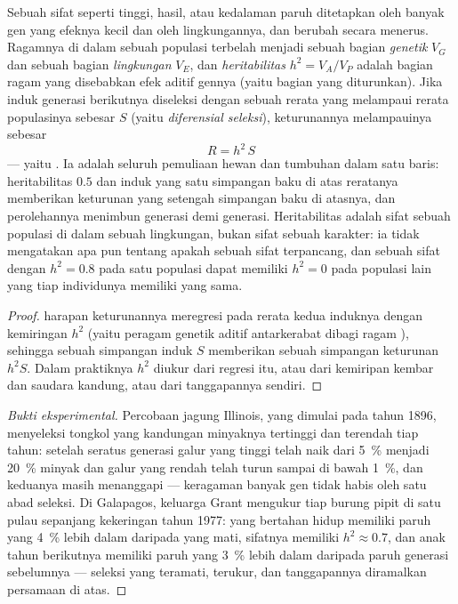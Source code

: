 \begin{theorem}\label{thm:b2:population-genetics:heritability}
Sebuah sifat seperti tinggi, hasil, atau kedalaman paruh ditetapkan
oleh banyak gen yang efeknya kecil dan oleh lingkungannya, dan berubah
secara menerus. Ragamnya di dalam sebuah populasi terbelah menjadi
sebuah bagian \emph{genetik} $V_G$ dan sebuah bagian \emph{lingkungan}
$V_E$, dan \emph{heritabilitas} $h^{2} = V_A/V_P$ adalah bagian ragam
 yang disebabkan efek aditif gennya (yaitu bagian yang
diturunkan). Jika induk generasi berikutnya diseleksi dengan sebuah
rerata yang melampaui rerata populasinya sebesar $S$ (yaitu
\emph{diferensial seleksi}), keturunannya melampauinya sebesar
\[
R = h^{2}\,S
\]
--- yaitu \emph{}. Ia adalah seluruh pemuliaan hewan
dan tumbuhan dalam satu baris: heritabilitas $0.5$ dan induk yang satu
simpangan baku di atas reratanya memberikan keturunan yang setengah
simpangan baku di atasnya, dan perolehannya menimbun generasi demi
generasi. Heritabilitas adalah sifat sebuah populasi di dalam sebuah
lingkungan, bukan sifat sebuah karakter: ia tidak mengatakan apa pun
tentang apakah sebuah sifat terpancang, dan sebuah sifat dengan $h^{2} = 0.8$ pada satu populasi dapat memiliki $h^{2} = 0$ pada populasi lain
yang tiap individunya memiliki  yang sama.
\end{theorem}
\begin{proof}
 harapan keturunannya meregresi pada  rerata kedua
induknya dengan kemiringan $h^{2}$ (yaitu peragam genetik aditif
antarkerabat dibagi ragam ), sehingga sebuah simpangan induk
$S$ memberikan sebuah simpangan keturunan $h^{2}S$. Dalam praktiknya
$h^{2}$ diukur dari regresi itu, atau dari kemiripan kembar dan saudara
kandung, atau dari tanggapannya sendiri.
\end{proof}
\begin{proof}[Bukti eksperimental]
Percobaan jagung Illinois, yang dimulai pada tahun 1896, menyeleksi
tongkol yang kandungan minyaknya tertinggi dan terendah tiap tahun:
setelah seratus generasi galur yang tinggi telah naik dari \qty{5}{\%}
menjadi \qty{20}{\%} minyak dan galur yang rendah telah turun sampai di
bawah \qty{1}{\%}, dan keduanya masih menanggapi --- keragaman banyak
gen tidak habis oleh satu abad seleksi. Di Galapagos, keluarga Grant
mengukur tiap burung pipit di satu pulau sepanjang kekeringan tahun
1977: yang bertahan hidup memiliki paruh yang \qty{4}{\%} lebih dalam
daripada yang mati, sifatnya memiliki $h^{2}
\approx 0.7$, dan anak
tahun berikutnya memiliki paruh yang \qty{3}{\%} lebih dalam daripada
paruh generasi sebelumnya --- seleksi yang teramati, terukur, dan
tanggapannya diramalkan persamaan di atas.
\end{proof}

